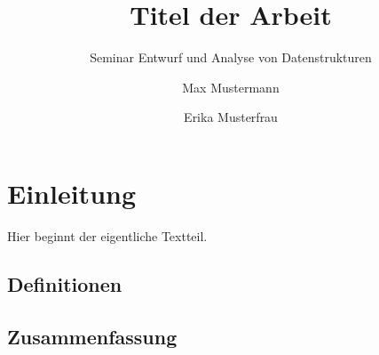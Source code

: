 \documentclass[seminar,german]{info1thesis}
\title{Titel der Arbeit}
\subtitle{Seminar \glqq Entwurf und Analyse von Datenstrukturen\grqq}
\author{Max Mustermann \and Erika Musterfrau}
\begin{document}






\section{Einleitung}
\label{sec:einleitung}

Hier beginnt der eigentliche Textteil.




\subsection{Definitionen}
\label{sec:definitionen}





\subsection{Zusammenfassung}
\label{sec:zusammenfassung}





\thesisbibliography

\end{document}
